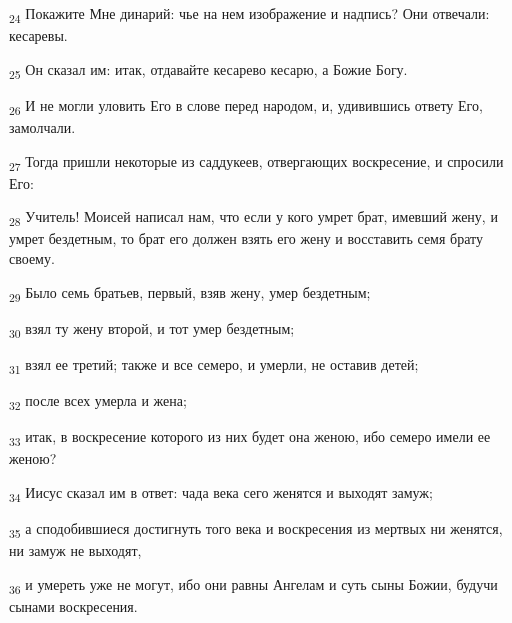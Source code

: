 \begin{tcolorbox}
\textsubscript{24} Покажите Мне динарий: чье на нем изображение и надпись? Они отвечали: кесаревы.
\end{tcolorbox}
\begin{tcolorbox}
\textsubscript{25} Он сказал им: итак, отдавайте кесарево кесарю, а Божие Богу.
\end{tcolorbox}
\begin{tcolorbox}
\textsubscript{26} И не могли уловить Его в слове перед народом, и, удивившись ответу Его, замолчали.
\end{tcolorbox}
\begin{tcolorbox}
\textsubscript{27} Тогда пришли некоторые из саддукеев, отвергающих воскресение, и спросили Его:
\end{tcolorbox}
\begin{tcolorbox}
\textsubscript{28} Учитель! Моисей написал нам, что если у кого умрет брат, имевший жену, и умрет бездетным, то брат его должен взять его жену и восставить семя брату своему.
\end{tcolorbox}
\begin{tcolorbox}
\textsubscript{29} Было семь братьев, первый, взяв жену, умер бездетным;
\end{tcolorbox}
\begin{tcolorbox}
\textsubscript{30} взял ту жену второй, и тот умер бездетным;
\end{tcolorbox}
\begin{tcolorbox}
\textsubscript{31} взял ее третий; также и все семеро, и умерли, не оставив детей;
\end{tcolorbox}
\begin{tcolorbox}
\textsubscript{32} после всех умерла и жена;
\end{tcolorbox}
\begin{tcolorbox}
\textsubscript{33} итак, в воскресение которого из них будет она женою, ибо семеро имели ее женою?
\end{tcolorbox}
\begin{tcolorbox}
\textsubscript{34} Иисус сказал им в ответ: чада века сего женятся и выходят замуж;
\end{tcolorbox}
\begin{tcolorbox}
\textsubscript{35} а сподобившиеся достигнуть того века и воскресения из мертвых ни женятся, ни замуж не выходят,
\end{tcolorbox}
\begin{tcolorbox}
\textsubscript{36} и умереть уже не могут, ибо они равны Ангелам и суть сыны Божии, будучи сынами воскресения.
\end{tcolorbox}

